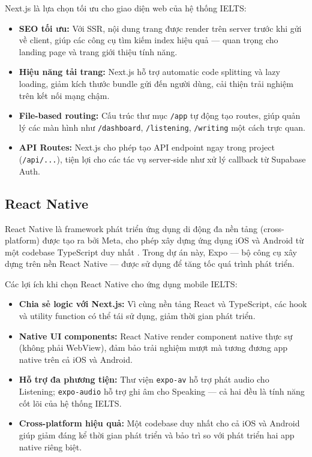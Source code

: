 \documentclass[a4paper,12pt]{extreport}
\begin{document}
Next.js là lựa chọn tối ưu cho giao diện web của hệ thống IELTS:

\begin{itemize}
    \item \textbf{SEO tối ưu:} Với SSR, nội dung trang được render trên server trước khi gửi về client, giúp các công cụ tìm kiếm index hiệu quả — quan trọng cho landing page và trang giới thiệu tính năng.
    \item \textbf{Hiệu năng tải trang:} Next.js hỗ trợ automatic code splitting và lazy loading, giảm kích thước bundle gửi đến người dùng, cải thiện trải nghiệm trên kết nối mạng chậm.
    \item \textbf{File-based routing:} Cấu trúc thư mục \texttt{/app} tự động tạo routes, giúp quản lý các màn hình như \texttt{/dashboard}, \texttt{/listening}, \texttt{/writing} một cách trực quan.
    \item \textbf{API Routes:} Next.js cho phép tạo API endpoint ngay trong project (\texttt{/api/...}), tiện lợi cho các tác vụ server-side như xử lý callback từ Supabase Auth.
\end{itemize}

\subsection{React Native}

React Native là framework phát triển ứng dụng di động đa nền tảng (cross-platform) được tạo ra bởi Meta, cho phép xây dựng ứng dụng iOS và Android từ một codebase TypeScript duy nhất \cite{reactnative-docs}. Trong dự án này, Expo — bộ công cụ xây dựng trên nền React Native — được sử dụng để tăng tốc quá trình phát triển.

Các lợi ích khi chọn React Native cho ứng dụng mobile IELTS:

\begin{itemize}
    \item \textbf{Chia sẻ logic với Next.js:} Vì cùng nền tảng React và TypeScript, các hook và utility function có thể tái sử dụng, giảm thời gian phát triển.
    \item \textbf{Native UI components:} React Native render component native thực sự (không phải WebView), đảm bảo trải nghiệm mượt mà tương đương app native trên cả iOS và Android.
    \item \textbf{Hỗ trợ đa phương tiện:} Thư viện \texttt{expo-av} hỗ trợ phát audio cho Listening; \texttt{expo-audio} hỗ trợ ghi âm cho Speaking — cả hai đều là tính năng cốt lõi của hệ thống IELTS.
    \item \textbf{Cross-platform hiệu quả:} Một codebase duy nhất cho cả iOS và Android giúp giảm đáng kể thời gian phát triển và bảo trì so với phát triển hai app native riêng biệt.
\end{itemize}
\end{document}
